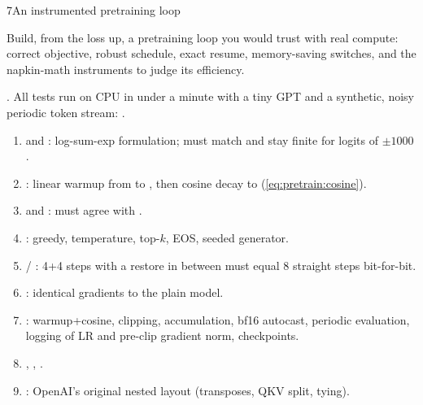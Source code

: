 \begin{labbox}{7}{An instrumented pretraining loop}

Build, from the loss up, a pretraining loop you would trust with real compute: correct
objective, robust schedule, exact resume, memory-saving switches, and the napkin-math
instruments to judge its efficiency.

. All tests run on CPU in under a minute
with a tiny GPT and a synthetic, noisy periodic token stream:
.

\begin{enumerate}
\item {} and : log-sum-exp formulation; must
  match  and stay finite for logits of $\pm1000$.
\item {}: linear warmup from  to , then
  cosine decay to  (\cref{eq:pretrain:cosine}).
\item {} and : must agree with
  .
\item {}: greedy, temperature, top-$k$, EOS, seeded generator.
\item {} / : 4+4 steps with a restore in between
  must equal 8 straight steps bit-for-bit.
\item {}: identical gradients to the plain model.
\item {}: warmup+cosine, clipping, accumulation, bf16 autocast, periodic
  evaluation, logging of LR and pre-clip gradient norm, checkpoints.
\item {}, , .
\item {}: OpenAI's original nested layout (transposes, QKV split,
  tying).
\end{enumerate}


\end{labbox}
